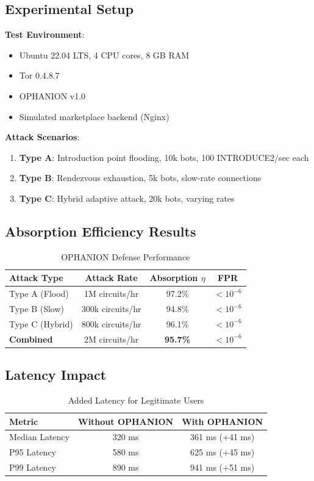 \documentclass[11pt,a4paper]{article}
\begin{document}
\subsection{Experimental Setup}

\textbf{Test Environment}:
\begin{itemize}
\item Ubuntu 22.04 LTS, 4 CPU cores, 8 GB RAM
\item Tor 0.4.8.7
\item OPHANION v1.0
\item Simulated marketplace backend (Nginx)
\end{itemize}

\textbf{Attack Scenarios}:
\begin{enumerate}
\item \textbf{Type A}: Introduction point flooding, 10k bots, 100 INTRODUCE2/sec each
\item \textbf{Type B}: Rendezvous exhaustion, 5k bots, slow-rate connections
\item \textbf{Type C}: Hybrid adaptive attack, 20k bots, varying rates
\end{enumerate}

\subsection{Absorption Efficiency Results}

\begin{table}[h]
\centering
\begin{tabular}{@{}lccc@{}}
\toprule
\textbf{Attack Type} & \textbf{Attack Rate} & \textbf{Absorption $\eta$} & \textbf{FPR} \\ \midrule
Type A (Flood) & 1M circuits/hr & 97.2\% & $< 10^{-6}$ \\
Type B (Slow) & 300k circuits/hr & 94.8\% & $< 10^{-6}$ \\
Type C (Hybrid) & 800k circuits/hr & 96.1\% & $< 10^{-6}$ \\
\textbf{Combined} & 2M circuits/hr & \textbf{95.7\%} & $< 10^{-6}$ \\
\bottomrule
\end{tabular}
\caption{OPHANION Defense Performance}
\end{table}

\subsection{Latency Impact}

\begin{table}[h]
\centering
\begin{tabular}{@{}lcc@{}}
\toprule
\textbf{Metric} & \textbf{Without OPHANION} & \textbf{With OPHANION} \\ \midrule
Median Latency & 320 ms & 361 ms (+41 ms) \\
P95 Latency & 580 ms & 625 ms (+45 ms) \\
P99 Latency & 890 ms & 941 ms (+51 ms) \\
\bottomrule
\end{tabular}
\caption{Added Latency for Legitimate Users}
\end{table}
\end{document}
